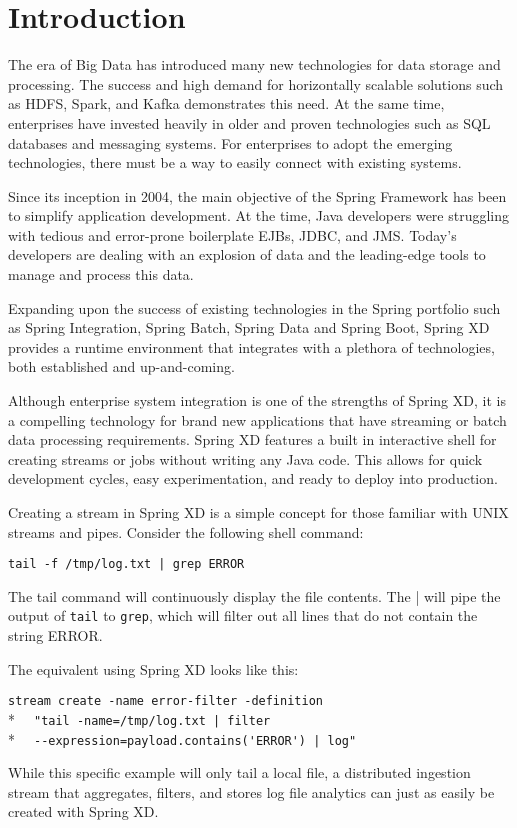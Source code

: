 \section{Introduction}

The era of Big Data has introduced many new technologies for data storage
and processing. The success and high demand for horizontally scalable
solutions such as HDFS, Spark, and Kafka demonstrates this need. At the
same time, enterprises have invested heavily in older and proven
technologies such as SQL databases and messaging systems. For enterprises
to adopt the emerging technologies, there must be a way to easily
connect with existing systems.

Since its inception in 2004, the main objective of the Spring Framework
has been to simplify application development. At the time, Java developers
were struggling with tedious and error-prone boilerplate EJBs, JDBC, and
JMS. Today's developers are dealing with an explosion of data and the
leading-edge tools to manage and process this data.

Expanding upon the success of existing technologies in the Spring portfolio
such as Spring Integration, Spring Batch, Spring Data and Spring Boot,
Spring XD provides a runtime environment that integrates with
a plethora of technologies, both established and up-and-coming.

Although enterprise system integration is one of the strengths of Spring XD,
it is a compelling technology for brand new applications that have streaming
or batch data processing requirements. Spring XD features a built in
interactive shell for creating streams or jobs without writing any Java code.
This allows for quick development cycles, easy experimentation, and ready
to deploy into production.

Creating a stream in Spring XD is a simple concept for those familiar with
UNIX streams and pipes. Consider the following shell command:

\verb;tail -f /tmp/log.txt | grep ERROR;

The tail command will continuously display the file contents. The |
will pipe the output of \texttt{tail} to \texttt{grep}, which will filter 
out all lines that do not contain the string ERROR.

The equivalent using Spring XD looks like this:

\verb;stream create -name error-filter -definition;\\*
\verb;  "tail -name=/tmp/log.txt | filter;\\*
\verb;  --expression=payload.contains('ERROR') | log";

While this specific example will only tail a local file, a distributed 
ingestion stream that aggregates, filters, and stores log file analytics
can just as easily be created with Spring XD.
